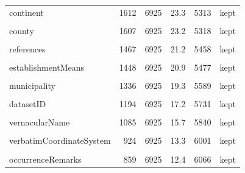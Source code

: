 \documentclass[sn-apa,pdflatex]{sn-jnl}
\begin{document}
\begin{longtable}[t]{lrrrrl}
\addlinespace
continent & 1612 & 6925 & 23.3 & 5313 & kept\\
\cellcolor{gray!10}{countryCode} & \cellcolor{gray!10}{1607} & \cellcolor{gray!10}{6925} & \cellcolor{gray!10}{23.2} & \cellcolor{gray!10}{5318} & \cellcolor{gray!10}{kept}\\
county & 1607 & 6925 & 23.2 & 5318 & kept\\
\cellcolor{gray!10}{verbatimEventDate} & \cellcolor{gray!10}{1520} & \cellcolor{gray!10}{6925} & \cellcolor{gray!10}{21.9} & \cellcolor{gray!10}{5405} & \cellcolor{gray!10}{kept}\\
references & 1467 & 6925 & 21.2 & 5458 & kept\\
\addlinespace
\cellcolor{gray!10}{specificEpithet} & \cellcolor{gray!10}{1454} & \cellcolor{gray!10}{6925} & \cellcolor{gray!10}{21.0} & \cellcolor{gray!10}{5471} & \cellcolor{gray!10}{kept}\\
establishmentMeans & 1448 & 6925 & 20.9 & 5477 & kept\\
\cellcolor{gray!10}{otherCatalogNumbers} & \cellcolor{gray!10}{1416} & \cellcolor{gray!10}{6925} & \cellcolor{gray!10}{20.4} & \cellcolor{gray!10}{5509} & \cellcolor{gray!10}{kept}\\
municipality & 1336 & 6925 & 19.3 & 5589 & kept\\
\cellcolor{gray!10}{institutionID} & \cellcolor{gray!10}{1276} & \cellcolor{gray!10}{6925} & \cellcolor{gray!10}{18.4} & \cellcolor{gray!10}{5649} & \cellcolor{gray!10}{kept}\\
\addlinespace
datasetID & 1194 & 6925 & 17.2 & 5731 & kept\\
\cellcolor{gray!10}{datasetKey} & \cellcolor{gray!10}{1193} & \cellcolor{gray!10}{6925} & \cellcolor{gray!10}{17.2} & \cellcolor{gray!10}{5732} & \cellcolor{gray!10}{kept}\\
vernacularName & 1085 & 6925 & 15.7 & 5840 & kept\\
\cellcolor{gray!10}{country} & \cellcolor{gray!10}{1062} & \cellcolor{gray!10}{6925} & \cellcolor{gray!10}{15.3} & \cellcolor{gray!10}{5863} & \cellcolor{gray!10}{kept}\\
verbatimCoordinateSystem & 924 & 6925 & 13.3 & 6001 & kept\\
\addlinespace
\cellcolor{gray!10}{class} & \cellcolor{gray!10}{904} & \cellcolor{gray!10}{6925} & \cellcolor{gray!10}{13.1} & \cellcolor{gray!10}{6021} & \cellcolor{gray!10}{kept}\\
occurrenceRemarks & 859 & 6925 & 12.4 & 6066 & kept\\

\end{longtable}
\end{document}
